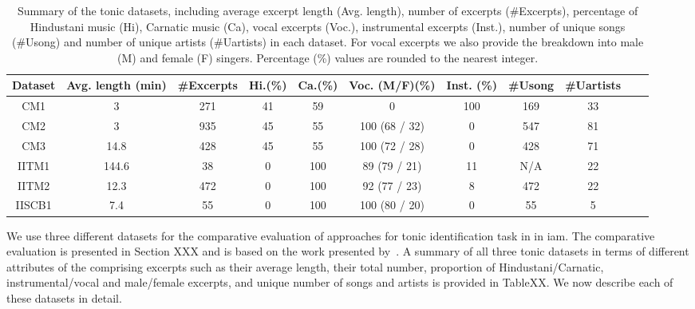 {\renewcommand{\arraystretch}{1.3}
\begin{table} 
\begin{centering}
	\begin{tabular}{ c | c  c  c  c  c  c  c  c  c  c }
\hline
\hline
		Dataset 	&Avg. length (min)&\#Excerpts&	 	Hi.(\%) 	& 	Ca.(\%)	& 	Voc.
		(M/F)(\%) & Inst. (\%)	& 	\#Usong   	& 	\#Uartists	\\
\hline
		CM1		&3 &271	&	 41		& 	59	&	0			& 	100		& 	169		&	33	\\
		CM2		&3 &935	&	 45	 	& 	55	&	100 (68 / 32)		&	0		& 	547		&	81	\\
		CM3		&14.8&428	&	 45	 	& 	55	&	100 (72 / 28)		& 	0		&	428		&	71	\\
\hdashline
		IITM1		&144.6&38&	 0		& 	100	&	89 (79 / 21)		&	11		& 	N/A		&	22	\\
		IITM2		&12.3 &472	&	 0	 	& 	100	&	92 (77 / 23)		&	8		& 	472		&	22	\\
\hdashline
		IISCB1		&7.4&55	&	 0		& 	100	&	100 (80 / 20)		&	0		& 	55		&	5	\\
\hline 
\hline
	\end{tabular}
	
	
	\caption{Summary of the tonic datasets, including average excerpt length (Avg. length),
		number of excerpts (\#Excerpts), percentage of Hindustani music (Hi), Carnatic
		music (Ca), vocal excerpts (Voc.), instrumental excerpts (Inst.), number of
		unique songs (\#Usong) and number of unique artists (\#Uartists) in each dataset. For vocal
		excerpts we also provide the breakdown into male (M) and female (F)
		singers. Percentage (\%) values are rounded to the nearest integer.}
	\label{tab:tonic_datasets}
\par \end{centering}	
\end{table}

We use three different datasets for the comparative evaluation of approaches for tonic identification task in in \gls{iam}. The comparative evaluation is presented in Section  XXX and is based on the work presented by~\cite{Gulati2014Tonic}. A summary of all three tonic datasets in terms of different attributes of the comprising excerpts such as their average length, their total number, proportion of Hindustani/Carnatic, instrumental/vocal and male/female excerpts, and unique number of songs and artists is provided in TableXX. We now describe each of these datasets in detail.








}
